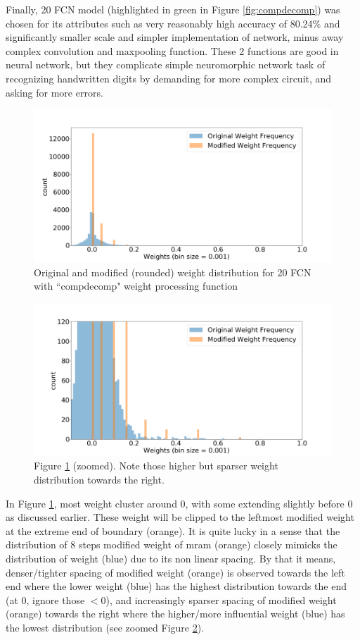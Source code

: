 Finally, 20 FCN model (highlighted in green in Figure \ref{fig:compdecomp}) was chosen for its attributes such as very reasonably high accuracy of 80.24\% and significantly smaller scale and simpler implementation of network, minus away complex convolution and maxpooling function. These 2 functions are good in neural network, but they complicate simple neuromorphic network task of recognizing handwritten digits by demanding for more complex circuit, and asking for more errors.
\begin{figure}[H]
	\centering
	\includegraphics[scale=0.3]{weightdist.png}
	\caption{Original and modified (rounded) weight distribution for 20 FCN with ``compdecomp" weight processing function}
	\label{fig:weightdist}
\end{figure}
\begin{figure}[H]
	\centering
	\includegraphics[scale=0.3]{weightdistzoom.png}
	\caption{Figure \ref{fig:weightdist} (zoomed). Note those higher but sparser weight distribution towards the right.}
	\label{fig:weightdistzoom}
\end{figure}
In Figure \ref{fig:weightdist}, most weight cluster around 0, with some extending slightly before 0 as discussed earlier. These weight will be clipped to the leftmost modified weight at the extreme end of boundary (orange). It is quite lucky in a sense that the distribution of 8 steps modified weight of mram (orange) closely mimicks the distribution of weight (blue) due to its non linear spacing. By that it means, denser/tighter spacing of modified weight (orange) is observed towards the left end where the lower weight (blue) has the highest distribution towards the end (at 0, ignore those $<0$), and increasingly sparser spacing of modified weight (orange) towards the right where the higher/more influential weight (blue) has the lowest distribution (see zoomed Figure \ref{fig:weightdistzoom}).
